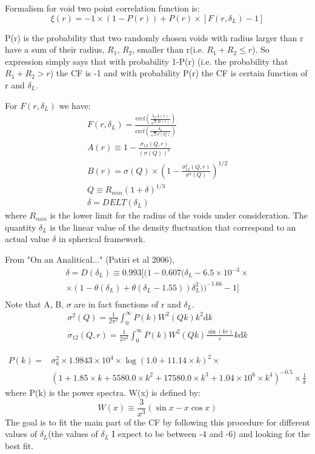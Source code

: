 Formalism for void two point correlation function is:
\begin{equation} \label{xi_r}
\xi(r) = -1 \times (1-P(r))+P(r)\times[F(r,\delta_L)-1]
\end{equation}

P(r) is the probability that two randomly chosen voids with radius larger than r have a sum of their radius, $R_1$, $R_2$, smaller than r(i.e. $ R_1 + R_2 \le r $). So expression simply says that with probability 1-P(r) (i.e. the probability that $R_1 + R_2  > r$) the CF is -1 and with probability P(r) the CF is certain function of r and $\delta_L$. 

For $F(r,\delta_L)$ we have:
\begin{eqnarray}
F(r,\delta_L) = \frac{\mathrm{ercf}\left(\frac{\delta_L A(r)} {\sqrt{2}B(r)}\right)} {\mathrm{ercf}\left(\frac{\delta_L} {\sqrt{2} \sigma(Q)}\right)} \\
A(r) \equiv 1- \frac{\sigma_{12}(Q,r)} {(\sigma(Q))^2} \\
B(r) = \sigma(Q) \times \left( 1 - \frac{\sigma_{12}^{2}(Q,r)} {\sigma^{4}(Q)}  \right)^{1/2} \\
Q \equiv R_{min}(1+\delta)^{1/3} \\
\delta = DELT(\delta_L)
\end{eqnarray}
where $R_{min}$ is the lower limit for the radius of the voids under consideration. The quantity $\delta_L$ is the linear value of the density fluctuation that correspond to an actual value $\delta$ in spherical framework.

From "On an Analitical..." (Patiri et al 2006),
\begin{eqnarray}
\delta = D(\delta _L) \equiv 0.993[(1-0.607(\delta _{L}-6.5\times 10^{-3} \times \nonumber \\ 
\times (1-\theta(\delta_{L})+\theta(\delta_{L}-1.55))\delta_L^2))^{-1.66}-1]\nonumber  \label{eq:eq4}
\\
\end{eqnarray}
Note that A, B, $\sigma$ are in fact functions of r and $\delta_L$.
\begin{eqnarray}
\sigma^{2}(Q)  = \frac{1}{2\pi^2} \int^{\infty}_{0} P(k) W^2(Qk) k^2 \mathrm{d}k \\
\sigma_{12}(Q,r) = \frac{1}{2\pi^2} \int^{\infty}_{0} P(k) W^2(Qk) \frac{\sin{(kr)}} {r} k \mathrm{d}k
\end{eqnarray}


\begin{eqnarray}\label{PK}
P(k) =&  \sigma_8^2 \times 1.9843\times 10^4 \times \log{(1.0+11.14\times k)}^2 \times \nonumber\\ 
 &(1 + 1.85\times k + 5580.0\times k^2 + 17580.0\times k^3 + 1.04\times 10^6 \times k^4)^{-0.5} \times \frac{1}{k}
\end{eqnarray}
where P(k) is the power spectra. W(x) is defined by:
$$
W(x) \equiv \frac{3}{x^3} (\sin{x} - x\cos{x})
$$
The goal is to fit the main part of the CF by following this procedure for different values of $\delta_L$(the values of $\delta_L$ I expect to be between -4 and -6) and looking for the best fit.


